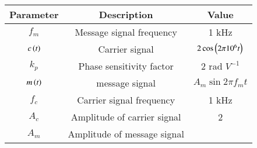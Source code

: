 \setlength{\arrayrulewidth}{0.3mm}
\setlength{\tabcolsep}{20pt}
\renewcommand{\arraystretch}{1.5}


\begin{tabular}{|c|c|c|}
\hline
Parameter & Description & Value\\
\hline
$f_m$ & Message signal frequency & 1 kHz\\
\hline
$c\left(t\right)$ & Carrier signal & $2\cos \left(2\pi 10^6 t\right)$\\
\hline
$k_p$ & Phase sensitivity factor & 2 rad $V^{-1}$\\
\hline
$m\left(t\right)$ &  message signal & $A_m\sin{2\pi f_m t}$\\
\hline
$f_c$ & Carrier signal frequency & 1 kHz\\
\hline
$A_c$ & Amplitude of carrier signal & 2 \\
\hline
$A_m$ & Amplitude of message signal & \\
\hline
\end{tabular}
